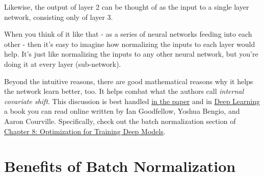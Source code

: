 \documentclass[11pt]{article}
\begin{document}
Likewise, the output of layer 2 can be thought of as the input to a
single layer network, consisting only of layer 3.

When you think of it like that - as a series of neural networks feeding
into each other - then it's easy to imagine how normalizing the inputs
to each layer would help. It's just like normalizing the inputs to any
other neural network, but you're doing it at every layer (sub-network).

Beyond the intuitive reasons, there are good mathematical reasons why it
helps the network learn better, too. It helps combat what the authors
call \emph{internal covariate shift}. This discussion is best handled
\href{https://arxiv.org/pdf/1502.03167.pdf}{in the paper} and in
\href{http://www.deeplearningbook.org}{Deep Learning} a book you can
read online written by Ian Goodfellow, Yoshua Bengio, and Aaron
Courville. Specifically, check out the batch normalization section of
\href{http://www.deeplearningbook.org/contents/optimization.html}{Chapter
8: Optimization for Training Deep Models}.

    \hypertarget{benefits-of-batch-normalization}{%
\section{Benefits of Batch
Normalization}\label{benefits-of-batch-normalization}}
\end{document}
